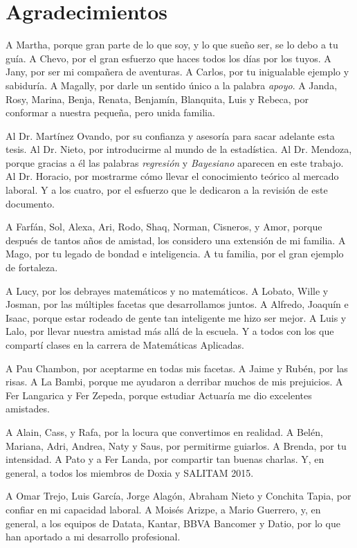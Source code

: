 \clearpage
\setcounter{page}{1}
\chapter*{Agradecimientos}
A Martha, porque gran parte de lo que soy, y lo que sueño ser, se lo debo a tu gu\'ia. A Chevo, por el gran esfuerzo que haces todos los d\'ias por los tuyos. A Jany, por ser mi compañera de aventuras. A Carlos, por tu inigualable ejemplo y sabidur\'ia. A Magally, por darle un sentido \'unico a la palabra \textit{apoyo}. A Janda, Rosy, Marina, Benja, Renata, Benjam\'in, Blanquita, Luis y Rebeca, por conformar a nuestra pequeña, pero unida familia.

Al Dr. Mart\'inez Ovando, por su confianza y asesor\'ia para sacar adelante esta tesis. Al Dr. Nieto, por introducirme al mundo de la estad\'istica. Al Dr. Mendoza, porque gracias a \'el las palabras \textit{regresi\'on} y \textit{Bayesiano} aparecen en este trabajo. Al Dr. Horacio, por mostrarme c\'omo llevar el conocimiento te\'orico al mercado laboral. Y a los cuatro, por el esfuerzo que le dedicaron a la revisi\'on de este documento.

A Farf\'an, Sol, Alexa, Ari, Rodo, Shaq, Norman, Cisneros, y Amor, porque despu\'es de tantos años de amistad, los considero una extensi\'on de mi familia. A Mago, por tu legado de bondad e inteligencia. A tu familia, por el gran ejemplo de fortaleza. 

A Lucy, por los debrayes matem\'aticos y no matem\'aticos. A Lobato, Wille y Josman, por las m\'ultiples facetas que desarrollamos juntos. A Alfredo, Joaquín e Isaac, porque estar rodeado de gente tan inteligente me hizo ser mejor. A Luis y Lalo, por llevar nuestra amistad m\'as all\'a de la escuela. Y a todos con los que compart\'i clases en la carrera de Matem\'aticas Aplicadas.

A Pau Chambon, por aceptarme en todas mis facetas. A Jaime y Rubén, por las risas. A La Bambi, porque me ayudaron a derribar muchos de mis prejuicios. A Fer Langarica y Fer Zepeda, porque estudiar Actuar\'ia me dio excelentes amistades.

A Alain, Cass, y Rafa, por la locura que convertimos en realidad. A Belén, Mariana, Adri, Andrea, Naty y Saus, por permitirme guiarlos. A Brenda, por tu intensidad. A Pato y a Fer Landa, por compartir tan buenas charlas. Y, en general, a todos los miembros de Doxia y SALITAM 2015. 

A Omar Trejo, Luis Garc\'ia, Jorge Alag\'on, Abraham Nieto y Conchita Tapia, por confiar en mi capacidad laboral. A Mois\'es Arizpe, a Mario Guerrero, y, en general, a los equipos de Datata, Kantar, BBVA Bancomer y Datio, por lo que han aportado a mi desarrollo profesional.

